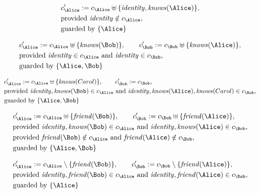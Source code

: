 \begin{align*}
&
c'_
{
\Alice
}
 := 
c_
{
\Alice
}
 \uplus 
\{
\mathit{
identity
}
,
\mathit{
knows
}
(
\Alice
)
\}
,\\
&
\text{provided } 
\mathit{
identity
}
 \notin c_
{
\Alice
}
,\\
&
\text{guarded by } \{
\Alice
\}
\end{align*}

\begin{align*}
&
c'_
{
\Alice
}
 := 
c_
{
\Alice
}
 \uplus 
\{
\mathit{
knows
}
(
\Bob
)
\}
, \qquad 
c'_
{
\Bob
}
 := 
c_
{
\Bob
}
 \uplus 
\{
\mathit{
knows
}
(
\Alice
)
\}
,\\
&
\text{provided } 
\mathit{
identity
}
 \in c_
{
\Alice
}
 \text{ and } 
\mathit{
identity
}
 \in c_
{
\Bob
}
,\\
&
\text{guarded by } \{
\Alice
,
\Bob
\}
\end{align*}

\begin{align*}
&
c'_
{
\Alice
}
 := 
c_
{
\Alice
}
 \uplus 
\{
\mathit{
knows
}
(
Carol
)
\}
, \qquad 
c'_
{
\Bob
}
 := 
c_
{
\Bob
}
,\\
&
\text{provided } 
\mathit{
identity
}
,
\mathit{
knows
}
(
\Bob
)
 \in c_
{
\Alice
}
 \text{ and } 
\mathit{
identity
}
,
\mathit{
knows
}
(
\Alice
)
,
\mathit{
knows
}
(
Carol
)
 \in c_
{
\Bob
}
,\\
&
\text{guarded by } \{
\Alice
,
\Bob
\}
\end{align*}

\begin{align*}
&
c'_
{
\Alice
}
 := 
c_
{
\Alice
}
 \uplus 
\{
\mathit{
friend
}
(
\Bob
)
\}
, \qquad 
c'_
{
\Bob
}
 := 
c_
{
\Bob
}
 \uplus 
\{
\mathit{
friend
}
(
\Alice
)
\}
,\\
&
\text{provided } 
\mathit{
identity
}
,
\mathit{
knows
}
(
\Bob
)
 \in c_
{
\Alice
}
 \text{ and } 
\mathit{
identity
}
,
\mathit{
knows
}
(
\Alice
)
 \in c_
{
\Bob
}
,\\
&
\text{provided } 
\mathit{
friend
}
(
\Bob
)
 \notin c_
{
\Alice
}
 \text{ and } 
\mathit{
friend
}
(
\Alice
)
 \notin c_
{
\Bob
}
,\\
&
\text{guarded by } \{
\Alice
,
\Bob
\}
\end{align*}

\begin{align*}
&
c'_
{
\Alice
}
 := 
c_
{
\Alice
}
 \setminus 
\{
\mathit{
friend
}
(
\Bob
)
\}
, \qquad 
c'_
{
\Bob
}
 := 
c_
{
\Bob
}
 \setminus 
\{
\mathit{
friend
}
(
\Alice
)
\}
,\\
&
\text{provided } 
\mathit{
identity
}
,
\mathit{
friend
}
(
\Bob
)
 \in c_
{
\Alice
}
 \text{ and } 
\mathit{
identity
}
,
\mathit{
friend
}
(
\Alice
)
 \in c_
{
\Bob
}
,\\
&
\text{guarded by } \{
\Alice
\}
\end{align*}
